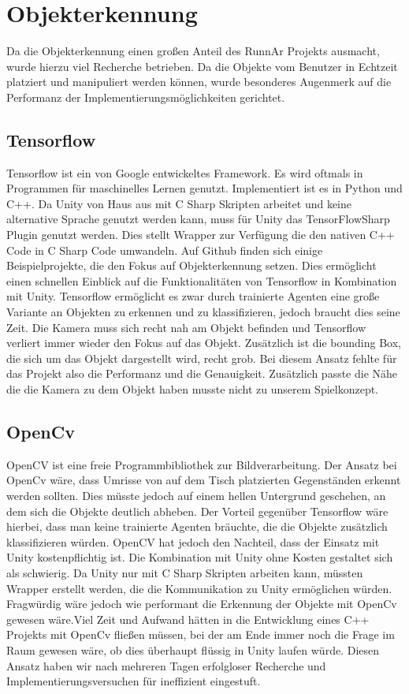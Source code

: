 
\section{Objekterkennung}
Da die Objekterkennung einen großen Anteil des RunnAr Projekts ausmacht, wurde hierzu viel Recherche betrieben. Da die Objekte vom Benutzer in Echtzeit platziert und manipuliert werden können, wurde besonderes Augenmerk auf die Performanz der Implementierungsmöglichkeiten gerichtet.
\subsection{Tensorflow}
Tensorflow ist ein von Google entwickeltes Framework. Es wird oftmals in Programmen für maschinelles Lernen genutzt.  Implementiert ist es in Python und C++. Da Unity von Haus aus mit C Sharp Skripten arbeitet und keine alternative Sprache genutzt werden kann, muss für Unity das TensorFlowSharp Plugin genutzt werden. Dies stellt Wrapper zur Verfügung die den nativen C++ Code in C Sharp Code umwandeln. Auf Github finden sich einige Beispielprojekte, die den Fokus auf Objekterkennung setzen. Dies ermöglicht einen schnellen Einblick auf die Funktionalitäten von Tensorflow in Kombination mit Unity. Tensorflow ermöglicht es zwar durch trainierte Agenten eine große Variante an Objekten zu erkennen und zu klassifizieren, jedoch braucht dies seine Zeit. Die Kamera muss sich recht nah am Objekt befinden und Tensorflow verliert immer wieder den Fokus auf das Objekt. Zusätzlich ist die bounding Box, die sich um das Objekt dargestellt wird, recht grob. Bei diesem Ansatz fehlte für das Projekt also die Performanz und die Genauigkeit. Zusätzlich passte die Nähe die die Kamera zu dem Objekt haben musste nicht zu unserem Spielkonzept. \cite{TensorFlow} 

\subsection{OpenCv}
OpenCV ist eine freie Programmbibliothek zur Bildverarbeitung. Der Ansatz bei OpenCv wäre, dass Umrisse von auf dem Tisch platzierten Gegenständen erkennt werden sollten. Dies müsste jedoch auf einem hellen Untergrund geschehen, an dem sich die Objekte deutlich abheben. Der Vorteil gegenüber Tensorflow wäre hierbei, dass man keine trainierte Agenten bräuchte, die die Objekte zusätzlich klassifizieren würden. OpenCV hat jedoch den Nachteil, dass der Einsatz mit Unity kostenpflichtig ist. Die Kombination mit Unity ohne Kosten gestaltet sich als schwierig. Da Unity nur mit C Sharp Skripten arbeiten kann, müssten Wrapper erstellt werden, die die Kommunikation zu Unity ermöglichen würden. Fragwürdig wäre jedoch wie performant die Erkennung der Objekte mit OpenCv gewesen wäre.Viel Zeit und Aufwand hätten in die Entwicklung eines C++ Projekts mit OpenCv fließen müssen, bei der am Ende immer noch die Frage im Raum gewesen wäre, ob dies überhaupt flüssig in Unity laufen würde. Diesen Ansatz haben wir nach mehreren Tagen erfolgloser  Recherche und Implementierungsversuchen für ineffizient eingestuft. 

